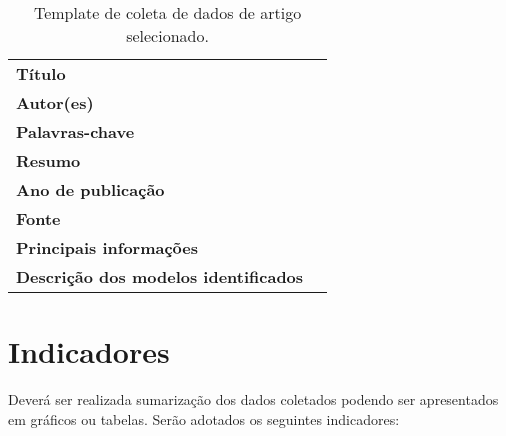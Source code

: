 \begin{table}[h]
    \centering
    \small
 {\renewcommand\arraystretch{1.25}
 \caption{Template de coleta de dados de artigo selecionado.}
 \label{tab:coleta_rs}

 \begin{tabular}{ l l }
  \cline{1-1}\cline{2-2}  
    \multicolumn{1}{p{4.500cm}|}{\textbf{\small Título}} &
    \multicolumn{1}{p{6.400cm}}{ }
  \\  
  \cline{1-1}\cline{2-2}  
    \multicolumn{1}{p{4.500cm}|}{\textbf{Autor(es)}} &
    \multicolumn{1}{p{6.400cm}}{ }
  \\  
  \cline{1-1}\cline{2-2}  
    \multicolumn{1}{p{4.500cm}|}{\textbf{Palavras-chave}} &
    \multicolumn{1}{p{6.400cm}}{ }
  \\  
  \cline{1-1}\cline{2-2}  
    \multicolumn{1}{p{4.500cm}|}{\textbf{Resumo}} &
    \multicolumn{1}{p{6.400cm}}{ }
  \\  
  \cline{1-1}\cline{2-2}  
    \multicolumn{1}{p{4.500cm}|}{\textbf{Ano de publicação}} &
    \multicolumn{1}{p{6.400cm}}{ }
  \\  
  \cline{1-1}\cline{2-2}  
    \multicolumn{1}{p{4.500cm}|}{\textbf{Fonte}} &
    \multicolumn{1}{p{6.400cm}}{ }
  \\  
  \cline{1-1}\cline{2-2}  
    \multicolumn{1}{p{4.500cm}|}{\textbf{Principais informações}} &
    \multicolumn{1}{p{6.400cm}}{ }
  \\  
  \cline{1-1}\cline{2-2}  
    \multicolumn{1}{p{4.500cm}|}{\textbf{\small Descrição dos modelos identificados}} &
    \multicolumn{1}{p{6.400cm}}{ }
  \\  
  \hline

 \end{tabular} }
\end{table}

\section{Indicadores}

Deverá ser realizada sumarização dos dados coletados podendo ser apresentados em gráficos ou tabelas. Serão adotados os seguintes indicadores: 

